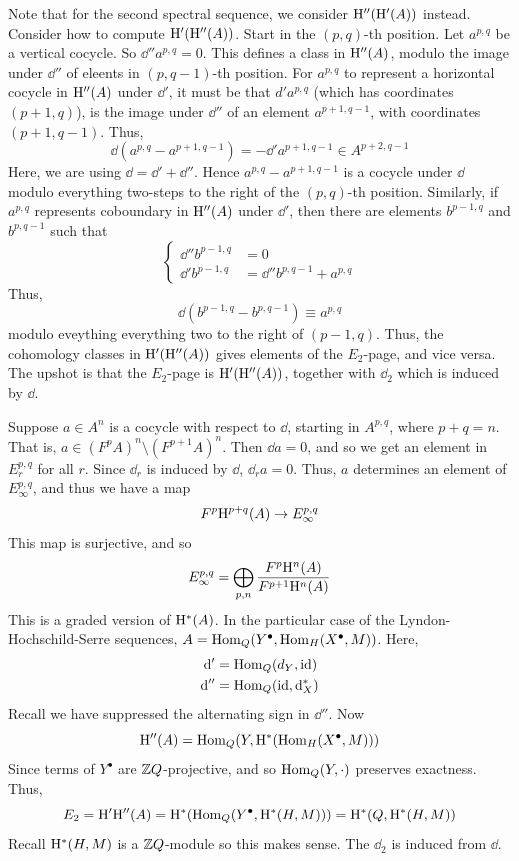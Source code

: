 \documentclass{article}
\begin{document}
Note that for the second spectral sequence,  we consider \(\mathrm{H}''(\mathrm{H}'(A))\) instead. Consider how to compute \(\mathrm{H}'(\mathrm{H}''(A))\). Start in the \((p, q)\)-th position. Let \(a^{p, q}\) be a vertical cocycle. So \(\dd'' a^{p, q} = 0\). This defines a class in \(\mathrm{H}''(A)\), modulo the image under \(\dd''\) of eleents in \((p, q-1)\)-th position. For \(a^{p, q}\) to represent a horizontal cocycle in \(\mathrm{H}''(A)\) under \(\dd'\), it must be that \(d'a^{p, q}\) (which has coordinates \((p+1, q)\)), is the image under \(\dd''\) of an element \(a^{p+1, q-1}\), with coordinates \((p+1, q-1)\). Thus,
\[\dd(a^{p, q} - a^{p+1, q-1}) = -\dd'a^{p+1, q-1} \in A^{p+2, q-1}\]
Here, we are using \(\dd = \dd' + \dd''\). Hence \(a^{p, q} - a^{p+1, q-1}\) is a cocycle under \(\dd\) modulo everything two-steps to the right of the \((p, q)\)-th position. Similarly, if \(a^{p, q}\) represents coboundary in \(\mathrm{H}''(A)\) under \(\dd'\), then there are elements \(b^{p-1, q}\) and \(b^{p, q-1}\) such that
\[\begin{cases}
    \dd'' b^{p-1, q} &= 0 \\
    \dd' b^{p-1, q} &= \dd'' b^{p, q-1} + a^{p, q}
\end{cases}\]
Thus,
\[\dd(b^{p-1, q} - b^{p, q-1}) \equiv a^{p, q}\]
modulo eveything everything two to the right of \((p-1, q)\). Thus, the cohomology classes in \(\mathrm{H}'(\mathrm{H}''(A))\) gives elements of the \(E_2\)-page, and vice versa. The upshot is that the \(E_2\)-page is \(\mathrm{H}'(\mathrm{H}''(A))\), together with \(\dd_2\) which is induced by \(\dd\).

Suppose \(a \in A^n\) is a cocycle with respect to \(\dd\), starting in \(A^{p, q}\), where \(p + q = n\). That is, \(a \in (F^pA)^n \setminus (F^{p+1}A)^n\). Then \(\dd a = 0\), and so we get an element in \(E^{p, q}_r\) for all \(r\). Since \(\dd_r\) is induced by \(\dd\), \(\dd_r a = 0\). Thus, \(a\) determines an element of \(E_\infty^{p, q}\), and thus we have a map
\[F^p\mathrm{H}^{p+q}(A) \to E^{p,q}_\infty\]
This map is surjective, and so
\[E_\infty^{p, q} = \bigoplus_{p, n}\frac{F^p\mathrm{H}^n(A)}{F^{p+1}\mathrm{H}^n(A)}\]
This is a graded version of \(\mathrm{H}^*(A)\). In the particular case of the Lyndon-Hochschild-Serre sequences, \(A = \operatorname{Hom}_Q(Y^\bullet, \operatorname{Hom}_H(X^\bullet, M))\). Here,
\begin{align*}
    \dd' &= \operatorname{Hom}_Q(d_Y, \operatorname{id}) \\
    \dd'' &= \operatorname{Hom}_Q(\operatorname{id}, \dd_X^*)
\end{align*}
Recall we have suppressed the alternating sign in \(\dd''\). Now
\[\mathrm{H}''(A) = \operatorname{Hom}_Q(Y, \mathrm{H}^*(\operatorname{Hom}_H(X^\bullet, M)))\]
Since terms of \(Y^\bullet\) are \(\mathbb{Z} Q\)-projective, and so \(\operatorname{Hom}_Q(Y, \cdot)\) preserves exactness. Thus,
\[E_2 = \mathrm{H}'\mathrm{H}''(A) = \mathrm{H}^*(\operatorname{Hom}_Q(Y^\bullet, \mathrm{H}^*(H, M))) = \mathrm{H}^*(Q, \mathrm{H}^*(H, M))\]
Recall \(\mathrm{H}^*(H, M)\) is a \(\mathbb{Z} Q\)-module so this makes sense. The \(\dd_2\) is induced from \(\dd\).
\end{document}
